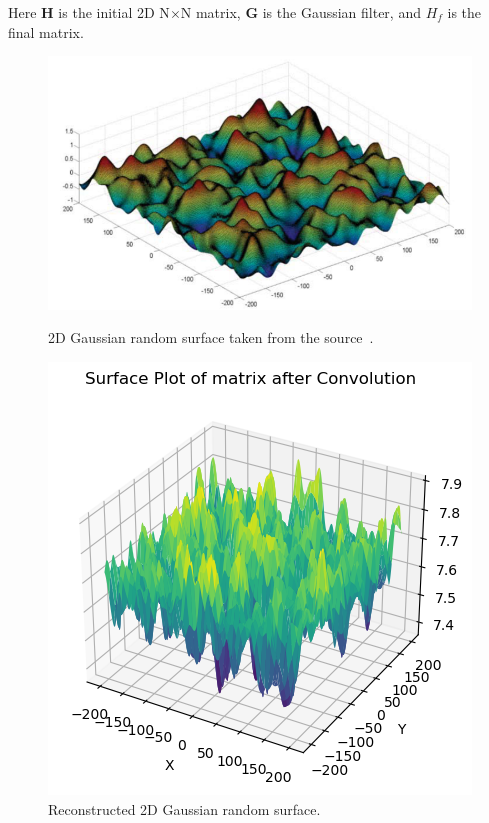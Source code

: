 \documentclass{optica-article}
\begin{document}
	Here \textbf{H} is the initial 2D N$\times$N matrix, \textbf{G} is the Gaussian filter, and \textbf{$H_f$} is the 
	final matrix.

	\begin{figure}[H]
		\centering
		\hspace{-1cm}
		\begin{minipage}{0.50\textwidth}
			\centering
			\includegraphics[width=\textwidth]{./Figures/gaussian_i.png} 
			\caption{2D Gaussian random surface taken from the source~\cite{mrnka2017random}.}
			\label{fig:sin_d}
		\end{minipage}\hfill
		\hspace{-0.8cm}
		\begin{minipage}{0.45\textwidth}
			\centering
			\includegraphics[width=\textwidth]{./Figures/gaussian.png} 
			\caption{Reconstructed 2D Gaussian random surface.}
			\label{fig:sin}
		\end{minipage}
	\end{figure}
			
\end{document}
